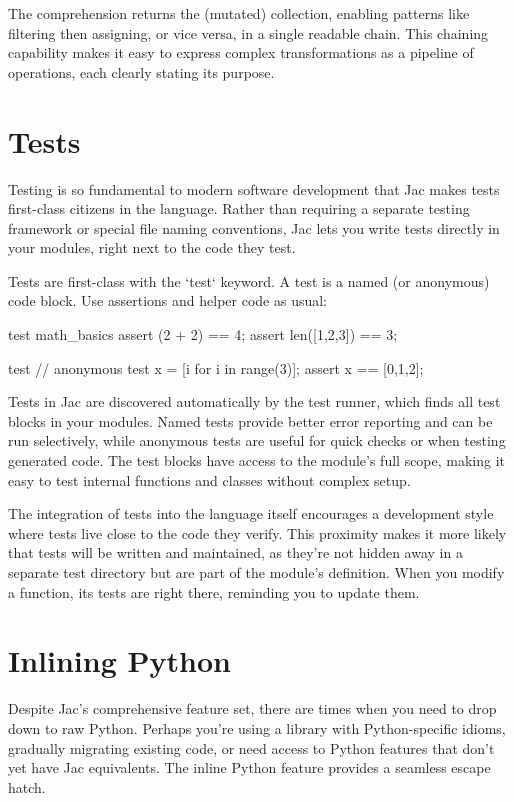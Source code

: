 The comprehension returns the (mutated) collection, enabling patterns like filtering then assigning, or vice versa, in a single readable chain. This chaining capability makes it easy to express complex transformations as a pipeline of operations, each clearly stating its purpose.

\section{Tests}

Testing is so fundamental to modern software development that Jac makes tests first-class citizens in the language. Rather than requiring a separate testing framework or special file naming conventions, Jac lets you write tests directly in your modules, right next to the code they test.

Tests are first-class with the `test` keyword. A test is a named (or anonymous) code block. Use assertions and helper code as usual:

\begin{jacblock}
test math_basics {
    assert (2 + 2) == 4;
    assert len([1,2,3]) == 3;
}

test {  // anonymous test
    x = [i for i in range(3)];
    assert x == [0,1,2];
}
\end{jacblock}

Tests in Jac are discovered automatically by the test runner, which finds all test blocks in your modules. Named tests provide better error reporting and can be run selectively, while anonymous tests are useful for quick checks or when testing generated code. The test blocks have access to the module's full scope, making it easy to test internal functions and classes without complex setup.

The integration of tests into the language itself encourages a development style where tests live close to the code they verify. This proximity makes it more likely that tests will be written and maintained, as they're not hidden away in a separate test directory but are part of the module's definition. When you modify a function, its tests are right there, reminding you to update them.

\section{Inlining Python}

Despite Jac's comprehensive feature set, there are times when you need to drop down to raw Python. Perhaps you're using a library with Python-specific idioms, gradually migrating existing code, or need access to Python features that don't yet have Jac equivalents. The inline Python feature provides a seamless escape hatch.

